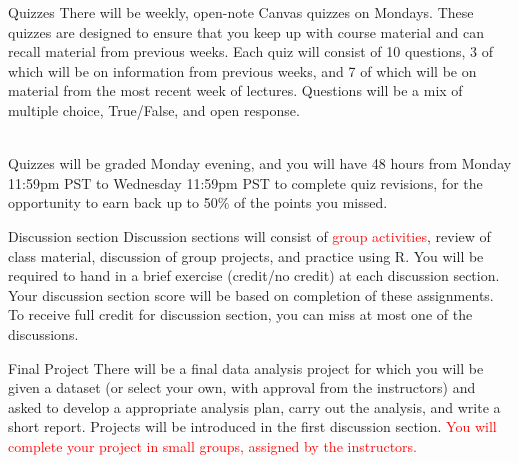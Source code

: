 \documentclass[10pt,t]{beamer}
\begin{document}
\begin{frame}{Quizzes}
There will be weekly, open-note Canvas quizzes on Mondays. These quizzes are designed to ensure that you keep up with course material and can recall material from previous weeks. Each quiz will consist of 10 questions, 3 of which will be on information from previous weeks, and 7 of which will be on material from the most recent week of lectures. Questions will be a mix of multiple choice, True/False, and open response. \\~\

Quizzes will be graded Monday evening, and you will have 48 hours from Monday 11:59pm PST to Wednesday 11:59pm PST to complete quiz revisions, for the opportunity to earn back up to 50\% of the points you missed.
\end{frame}


\begin{frame}{Discussion section}
Discussion sections will consist of \textcolor{red}{group activities}, review of class material, discussion of group projects, and practice using R. You will be required to hand in a brief exercise (credit/no credit) at each discussion section. Your discussion section score will be based on completion of these assignments. To receive full credit for discussion section, you can miss at most one of the discussions.
\end{frame}

\begin{frame}{Final Project}
There will be a final data analysis project for which you will be given a dataset (or select your own, with approval from the instructors) and asked to develop a appropriate analysis plan, carry out the analysis, and write a short report. Projects will be introduced in the first discussion section. \textcolor{red}{You will complete your project in small groups, assigned by the instructors.}
\end{frame}
\end{document}
